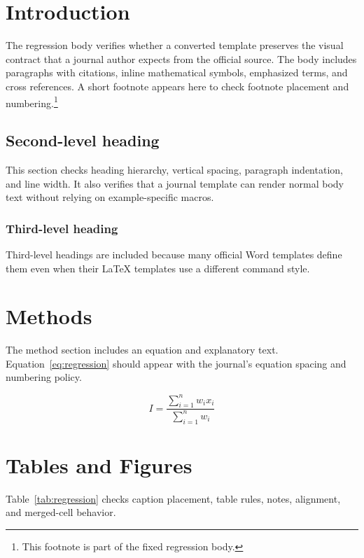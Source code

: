 \section{Introduction}
The regression body verifies whether a converted template preserves the visual contract that a journal author expects from the official source. The body includes paragraphs with citations, inline mathematical symbols, emphasized terms, and cross references. A short footnote appears here to check footnote placement and numbering.\footnote{This footnote is part of the fixed regression body.}

\subsection{Second-level heading}
This section checks heading hierarchy, vertical spacing, paragraph indentation, and line width. It also verifies that a journal template can render normal body text without relying on example-specific macros.

\subsubsection{Third-level heading}
Third-level headings are included because many official Word templates define them even when their LaTeX templates use a different command style.

\section{Methods}
The method section includes an equation and explanatory text. Equation~\ref{eq:regression} should appear with the journal's equation spacing and numbering policy.

\begin{equation}
I = \frac{\sum_{i=1}^{n} w_i x_i}{\sum_{i=1}^{n} w_i}
\label{eq:regression}
\end{equation}

\section{Tables and Figures}
Table~\ref{tab:regression} checks caption placement, table rules, notes, alignment, and merged-cell behavior.

